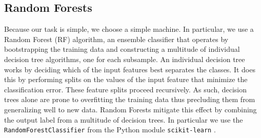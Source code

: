 \documentclass[twocolumn]{aastex6}
\begin{document}
\subsection{Random Forests}
Because our task is simple, we choose a simple machine. In particular, we use 
a Random Forest (RF) algorithm,  an ensemble classifier that operates by bootstrapping
the training data and constructing a multitude of individual decision tree algorithms, 
one for each subsample.  An individual decision tree works by deciding which of 
the input features best separates the classes. It does this by performing 
splits on the values of the input feature that minimize the classification 
error. These feature splits proceed recursively. As such, decision trees alone are
 prone to overfitting the training data thus precluding them from generalizing 
well to new data. Random Forests mitigate this effect by combining the 
output label from a multitude of decision trees.  In particular we use the 
\texttt{RandomForestClassifier} from the Python module \texttt{scikit-learn}
\citep{scikit-learn}. 

\end{document}
